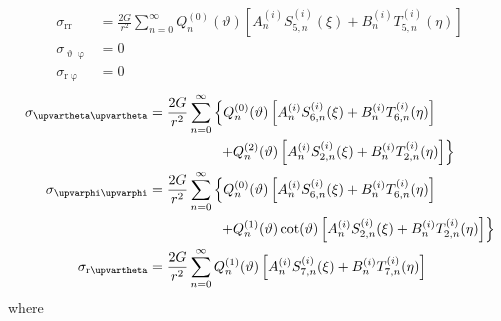 \begin{align}\label{Eq1:stressFieldComponents1}
	\sigma_{\mathrm{r}\mathrm{r}} &= \frac{2G}{r^2}\sum_{n=0}^\infty Q_n^{(0)}(\vartheta)\left[A_n^{(i)} S_{5,n}^{(i)}(\xi) + B_n^{(i)} T_{5,n}^{(i)}(\eta)\right]\\\label{Eq1:stressFieldComponents4}
	\sigma_{\upvartheta\upvarphi} &= 0\\\label{Eq1:stressFieldComponents5}
	\sigma_{\mathrm{r}\upvarphi} &= 0
\end{align}
\begin{align}
	\sigma_{\upvartheta\upvartheta} &= \frac{2G}{r^2}\sum_{n=0}^\infty\left\{Q_n^{(0)}(\vartheta)\left[A_n^{(i)} S_{6,n}^{(i)}(\xi) + B_n^{(i)} T_{6,n}^{(i)}(\eta)\right]\right.\nonumber\\ \label{Eq1:stressFieldComponents2}
	&{\hskip5em\relax}\left.+  Q_n^{(2)}(\vartheta)\left[A_n^{(i)} S_{2,n}^{(i)}(\xi) + B_n^{(i)} T_{2,n}^{(i)}(\eta)\right]\right\}\\
	\sigma_{\upvarphi\upvarphi} &= \frac{2G}{r^2}\sum_{n=0}^\infty\left\{Q_n^{(0)}(\vartheta)\left[A_n^{(i)} S_{6,n}^{(i)}(\xi) + B_n^{(i)} T_{6,n}^{(i)}(\eta)\right]\right.\nonumber\\ \label{Eq1:stressFieldComponents3}
	&{\hskip5em\relax}\left. +   Q_n^{(1)}(\vartheta)\cot(\vartheta)\left[A_n^{(i)} S_{2,n}^{(i)}(\xi) + B_n^{(i)} T_{2,n}^{(i)}(\eta)\right]\right\}\\\label{Eq1:stressFieldComponents6}
	\sigma_{\mathrm{r}\upvartheta} &= \frac{2G}{r^2}\sum_{n=0}^\infty Q_n^{(1)}(\vartheta)\left[A_n^{(i)} S_{7,n}^{(i)}(\xi) + B_n^{(i)} T_{7,n}^{(i)}(\eta)\right]
\end{align}
where
